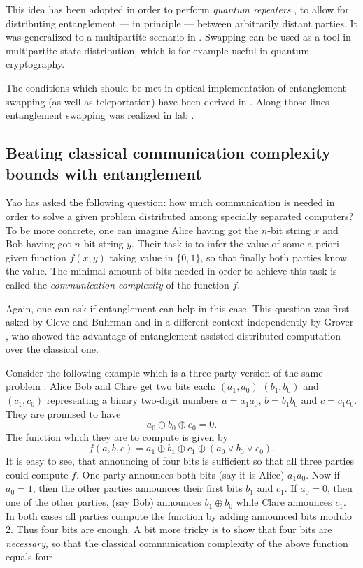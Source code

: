 \documentclass[rmp,12pt,preprint]{revtex4-2}
\begin{document}
This idea has been adopted in order to perform {\it quantum repeaters}
\cite{repeaters}, to allow for distributing entanglement --- in
principle --- between arbitrarily distant parties. It was generalized
to a multipartite scenario in \cite{BoseWKt}.  Swapping can be used as
a tool in multipartite state distribution, which is for example useful
in quantum cryptography.

The conditions which should be met in optical implementation of
entanglement swapping (as well as teleportation) have been derived in
\cite{ent_swapping}. Along those lines entanglement swapping was
realized in lab \cite{exp_ent_swapping}.



\subsection{Beating classical communication complexity bounds with entanglement}
\label{subsec:Boundent}

Yao \cite{Yao_complexity} has asked the following question: how much
communication is needed in order to solve a given problem distributed
among specially separated computers? To be more concrete, one can
imagine Alice having got the $n$-bit string $x$ and Bob having got
$n$-bit string $y$. Their task is to infer the value of some a priori
given function $f(x,y)$ taking value in $\{0,1\}$, so that finally
both parties know the value. The minimal amount of bits needed in
order to achieve this task is called the {\it communication
  complexity} of the function $f$.

Again, one can ask if entanglement can help in this case. This
question was first asked by Cleve and Buhrman \cite{CBcom_cplx_1} and
in a different context independently by Grover \cite{Gcom_cplx_1}, who
showed the advantage of entanglement assisted distributed computation
over the classical one.

Consider the following example which is a three-party version of the
same problem \cite{BuhrmanCD1997-complexity}. Alice Bob and Clare get
two bits each: $(a_1,a_0)$ $(b_1,b_0)$ and $(c_1,c_0)$ representing a
binary two-digit numbers $a=a_1a_0$, $b=b_1b_0$ and $c=c_1c_0$. They
are promised to have
\begin{equation}
  a_0\oplus b_0 \oplus c_0 = 0.
 \label{eq:promise}
\end{equation}
The function which they are to compute is given by
\begin{equation}
f(a,b,c) = a_1\oplus b_1\oplus c_1\oplus (a_0 \vee b_0 \vee c_0).
\end{equation}
It is easy to see, that announcing of four bits is sufficient so that
all three parties could compute $f$. One party announces both bits
(say it is Alice) $a_1a_0$. Now if $a_0=1$, then the other parties
announces their first bits $b_1$ and $c_1$.  If $a_0=0$, then one of
the other parties, (say Bob) announces $b_1\oplus b_0$ while Clare
announces $c_1$. In both cases all parties compute the function by
adding announced bits modulo 2. Thus four bits are enough. A bit more
tricky is to show that four bits are {\it necessary}, so that the
classical communication complexity of the above function equals four
\cite{BuhrmanCD1997-complexity}.
\end{document}
